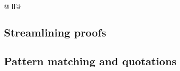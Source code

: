 \begin{isabellebody}
\begin{tabular}{@ {}ll@ {}}
\begin{minipage}[t]{.4\textwidth}
\end{minipage}
\end{tabular}
\begin{isamarkuptext}%
\section{Streamlining proofs}

\subsection{Pattern matching and quotations}


\end{isamarkuptext}
\end{isabellebody}
